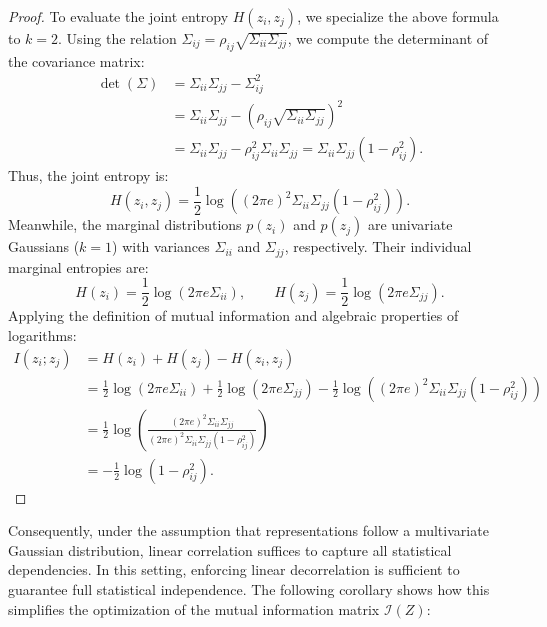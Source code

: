 \documentclass[11pt, oneside, openany]{book}
\begin{document}
\begin{proof}
To evaluate the joint entropy $H(z_{i}, z_{j})$, we specialize the above formula to $k = 2$. Using the relation $\Sigma_{ij} = \rho_{ij}\sqrt{\Sigma_{ii}\Sigma_{jj}}$, we compute the determinant of the covariance matrix:
\begin{align}
\det(\Sigma) &= \Sigma_{ii}\Sigma_{jj} - \Sigma_{ij}^{2} \nonumber \\
&= \Sigma_{ii}\Sigma_{jj} - \left( \rho_{ij}\sqrt{\Sigma_{ii}\Sigma_{jj}} \right)^{2} \label{eq:5.9} \\
&= \Sigma_{ii}\Sigma_{jj} - \rho_{ij}^{2}\Sigma_{ii}\Sigma_{jj} = \Sigma_{ii}\Sigma_{jj}\left(1 - \rho_{ij}^{2}\right). \nonumber
\end{align}
Thus, the joint entropy is:
\begin{equation}
\label{eq:5.10}
H(z_{i}, z_{j}) = \frac{1}{2}\log\left( (2\pi e)^{2} \Sigma_{ii}\Sigma_{jj}(1 - \rho_{ij}^{2}) \right).
\end{equation}
Meanwhile, the marginal distributions $p(z_{i})$ and $p(z_{j})$ are univariate Gaussians ($k = 1$) with variances $\Sigma_{ii}$ and $\Sigma_{jj}$, respectively. Their individual marginal entropies are:
\begin{equation}
\label{eq:5.11}
H(z_{i}) = \frac{1}{2}\log(2\pi e \Sigma_{ii}), \qquad H(z_{j}) = \frac{1}{2}\log(2\pi e \Sigma_{jj}).
\end{equation}
Applying the definition of mutual information and algebraic properties of logarithms:
\begin{align}
I(z_{i}; z_{j}) &= H(z_{i}) + H(z_{j}) - H(z_{i}, z_{j}) \nonumber \\
&= \frac{1}{2}\log(2\pi e \Sigma_{ii}) + \frac{1}{2}\log(2\pi e \Sigma_{jj}) - \frac{1}{2}\log\left( (2\pi e)^{2}\Sigma_{ii}\Sigma_{jj}(1 - \rho_{ij}^{2}) \right) \nonumber \\
&= \frac{1}{2}\log\left( \frac{(2\pi e)^{2}\Sigma_{ii}\Sigma_{jj}}{(2\pi e)^{2}\Sigma_{ii}\Sigma_{jj}(1 - \rho_{ij}^{2})} \right) \nonumber \\
&= -\frac{1}{2}\log\left(1 - \rho_{ij}^{2}\right). \label{eq:5.12}
\end{align}
\end{proof}

Consequently, under the assumption that representations follow a multivariate Gaussian distribution, linear correlation suffices to capture all statistical dependencies. In this setting, enforcing linear decorrelation is sufficient to guarantee full statistical independence. The following corollary shows how this simplifies the optimization of the mutual information matrix $\mathcal{I}(Z)$:
\end{document}
